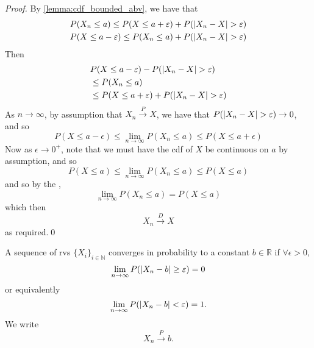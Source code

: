 \documentclass[notoc,notitlepage]{tufte-book}
\newcommand{\convd}{\overset{D}{\to}}
\newcommand{\convp}{\overset{P}{\to}}
\begin{document}
\begin{proof}
  By \cref{lemma:cdf_bounded_abv}, we have that
  \begin{gather*}
    P(X_n \leq a) \leq P(X \leq a + \varepsilon) + P(\left|X_n - X\right| > \varepsilon) \\
    P(X \leq a - \varepsilon) \leq P(X_n \leq a) + P(\left|X_n - X\right| > \varepsilon)
  \end{gather*}
  Then
  \begin{align*}
    &P(X \leq a - \varepsilon) - P(\left|X_n - X\right| > \varepsilon) \\
    &\leq P(X_n \leq a) \\
    &\leq P(X \leq a + \varepsilon) + P(\left|X_n - X\right| > \varepsilon)
  \end{align*}
  As $n \to \infty$, by assumption that $X_n \convp X$, we have that $P(\left|X_n - X\right| > \varepsilon) \to 0$, and so
  \begin{equation*}
    P(X \leq a - \epsilon) \leq \lim_{n \to \infty} P(X_n \leq a) \leq P(X \leq a + \epsilon)
  \end{equation*}
  Now as $\epsilon \to 0^+$, note that we must have the cdf of $X$ be continuous on $a$ by assumption, and so
  \begin{equation*}
    P(X \leq a) \leq \lim_{n \to \infty} P(X_n \leq a) \leq P(X \leq a)
  \end{equation*}
  and so by the ,
  \begin{equation*}
    \lim_{n \to \infty} P(X_n \leq a) = P(X \leq a)
  \end{equation*}
  which then
  \begin{equation*}
    X_n \convd X
  \end{equation*}
  as required.\qed
\end{proof}

\begin{defn}
\label{defn:convergence_in_probability_to_a_constant}
  A sequence of rvs $\{X_i\}_{i \in \mathbb{N}}$ converges in probability to a constant $b \in \mathbb{R}$ if $\forall \epsilon > 0$,
  \begin{equation*}
    \lim_{n \to \infty} P( \left|X_n - b\right| \geq \varepsilon ) = 0
  \end{equation*}
  or equivalently
  \begin{equation*}
    \lim_{n \to \infty} P( \left|X_n - b\right| < \varepsilon ) = 1.
  \end{equation*}
  We write
  \begin{equation*}
    X_n \convp b.
  \end{equation*}
\end{defn}
\end{document}
